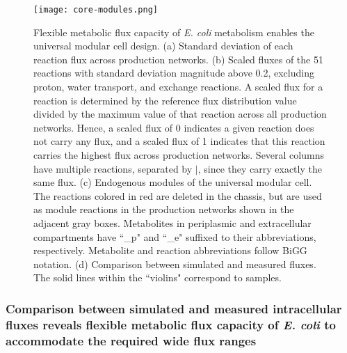 %
\begin{figure}[!hp]
    \centering
    \texttt{[image: core-modules.png]}
    \caption[Flexible metabolic flux capacity of \textit{E. coli} metabolism enables the universal modular cell design]{Flexible metabolic flux capacity of \textit{E. coli} metabolism enables the universal modular cell design. (a) Standard deviation of each reaction flux  across production networks. (b) Scaled fluxes of the 51 reactions with standard deviation magnitude above 0.2,  excluding proton, water transport, and exchange reactions. A scaled flux for a reaction is determined by the reference flux distribution value divided by the maximum value of that reaction across all production networks. Hence, a scaled flux of 0 indicates a given reaction does not carry any flux, and a scaled flux of 1 indicates that this reaction carries the highest flux across production networks.  Several columns have multiple reactions, separated by $\vert$, since they carry exactly the same flux. (c) Endogenous modules of the universal modular cell.  The reactions colored in red are deleted in the chassis, but are used as module reactions in the production networks shown in the adjacent gray boxes. Metabolites in periplasmic and extracellular compartments have ``\_p" and ``\_e" suffixed to their abbreviations, respectively. Metabolite and reaction abbreviations follow BiGG\citep{king2015} notation.  (d) Comparison between simulated and measured fluxes. The solid lines within the ``violins" correspond to samples.
    }%
    \label{fig5:core-modules}
\end{figure}

\subsubsection{Comparison between simulated and measured intracellular fluxes reveals flexible metabolic flux capacity of \textit{E. coli} to accommodate the required wide flux ranges} \label{sec:flux_comparison}

